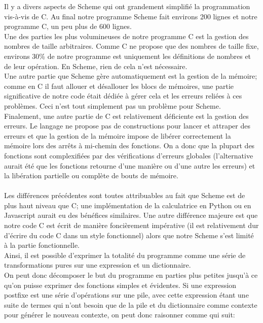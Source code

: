 \documentclass[titlepage, 12pt]{article}
\begin{document}
Il y a divers aspects de Scheme qui ont grandement simplifié la programmation vis-à-vis de C. Au final notre programme Scheme fait environs 200 lignes et notre programme C, un peu plus de 600 lignes.\\
Une des parties les plus volumineuses de notre programme C est la gestion des nombres de taille arbitraires. Comme C ne propose que des nombres de taille fixe, environs 30\% de notre programme est uniquement les définitions de nombres et de leur opération. En Scheme, rien de cela n'est nécessaire.\\
Une autre partie que Scheme gère automatiquement est la gestion de la mémoire; comme en C il faut allouer et désallouer les blocs de mémoires, une partie significative de notre code était dédiée à gérer cela et les erreurs reliées à ces problèmes. Ceci n'est tout simplement pas un problème pour Scheme.\\
Finalement, une autre partie de C est relativement déficiente est la gestion des erreurs. Le langage ne propose pas de constructions pour lancer et attraper des erreurs et que la gestion de la mémoire impose de libérer correctement la mémoire lors des arrêts à mi-chemin des fonctions. On a donc que la plupart des fonctions sont complexifiées par des vérifications d'erreurs globales (l'alternative aurait été que les fonctions retourne d'une manière ou d'une autre les erreurs) et la libération partielle ou complète de bouts de mémoire.\\
\\
Les différences précédentes sont toutes attribuables au fait que Scheme est de plus haut niveau que C; une implémentation de la calculatrice en Python ou en Javascript aurait eu des bénéfices similaires. Une autre différence majeure est que notre code C est écrit de manière foncièrement impérative (il est relativement dur d'écrire du code C dans un style fonctionnel) alors que notre Scheme s'est limité à la partie fonctionnelle.\\
Ainsi, il est possible d'exprimer la totalité du programme comme une série de transformations pures sur une expression et un dictionnaire.\\
On peut donc décomposer le but du programme en parties plus petites jusqu'à ce qu'on puisse exprimer des fonctions simples et évidentes. Si une expression postfixe est une série d'opérations sur une pile, avec cette expression étant une suite de termes qui n'ont besoin que de la pile et du dictionnaire comme contexte pour générer le nouveau contexte, on peut donc raisonner comme qui suit:\\
\end{document}
